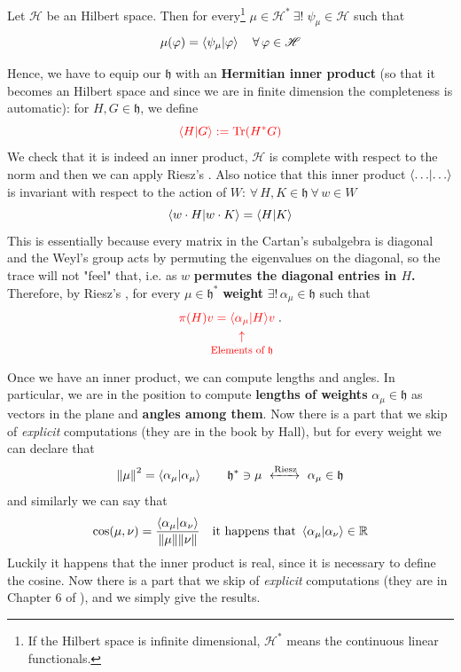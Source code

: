 \documentclass[../main.tex]{subfiles}
\begin{document}
\begin{lemma}Let $\mathcal{H}$ be an Hilbert space. Then for every\footnote{If the Hilbert space is infinite dimensional, $\mathcal{H}^\ast$ means the continuous linear functionals.} $\mu\in\mathcal{H}^\ast\ \exists!\;\psi_\mu\in\mathcal{H}$ such that
\[
\mu(\varphi)=\braket{\psi_\mu}{\varphi}\quad\forall\,\varphi\in\mathcal{H}
\]
\end{lemma}
Hence, we have to equip our $\mathfrak{h}$ with an \textbf{Hermitian inner product} (so that it becomes an Hilbert space and since we are in finite dimension the completeness is automatic): for $H,G\in\mathfrak{h}$, we define
\[
{\color{red}\braket{H}{G}:=\Tr(H^\ast G)}
\]
We check that it is indeed an inner product, $\mathcal{H}$ is complete with respect to the norm and then we can apply Riesz's . Also notice that this inner product $\braket{\dots}$ is invariant with respect to the action of $W$: $\forall\,H,K\in\mathfrak{h}\ \forall\,w\in W$
\[
\braket{w\cdot H}{w\cdot K}=\braket{H}{K}
\]
This is essentially because every matrix in the Cartan's subalgebra is diagonal and the Weyl's group acts by permuting the eigenvalues on the diagonal, so the trace will not "feel" that, i.e. as $w$ \textbf{permutes the diagonal entries in $H$.} Therefore, by Riesz's , for every $\mu\in\mathfrak{h}^\ast$ \textbf{weight} $\exists!\,\alpha_\mu\in\mathfrak{h}$ such that
\[
{\color{red}\pi(H)v=\langle\underset{\mathclap{\tikz \node {$\uparrow$} node [below=1ex] {\footnotesize Elements of $\mathfrak{h}$};}}{\alpha_\mu}|H\rangle 
v}\;.
\]
Once we have an inner product, we can compute lengths and angles. In particular, we are in the position to compute \textbf{lengths of  weights} $\alpha_\mu\in\mathfrak{h}$ as vectors in the plane and\textbf{ angles among them}. Now there is a part that we skip of \textit{explicit} computations (they are in the book by Hall), but for every weight we can declare that
\[
\norm{\mu}^2=\braket{\alpha_\mu}\qquad \mathfrak{h}^\ast\ni\mu \ \xleftrightarrow{\textrm{Riesz}} \ \alpha_\mu\in\mathfrak{h}
\]
and similarly we can say that
\[
\cos(\mu,\nu)=\frac{\braket{\alpha_\mu}{\alpha_\nu}}{\norm{\mu}\norm{\nu}} \quad \textrm{it happens that} \ \braket{\alpha_\mu}{\alpha_\nu}\in\mathbb{R}
\]
Luckily it happens that the inner product is real, since it is necessary to define the cosine. Now there is a part that we skip of \textit{explicit} computations (they are in Chapter 6 of ), and we simply give the results.
\end{document}
